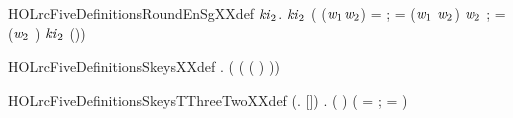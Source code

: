 \begin{SaveVerbatim}{HOLrcFiveDefinitionsRoundEnSgXXdef}
\HOLTokenTurnstile{} \HOLSymConst{\HOLTokenForall{}}  \ensuremath{\HOLBoundVar{ki}\sb{\mathrm{2}}}.
        \ensuremath{\HOLBoundVar{ki}\sb{\mathrm{2}}} \HOLSymConst{=}
     (
        (\ensuremath{\HOLBoundVar{w}\sb{\mathrm{1}}}\HOLSymConst{,}\ensuremath{\HOLBoundVar{w}\sb{\mathrm{2}}}) = ;
         = (\ensuremath{\HOLBoundVar{w}\sb{\mathrm{1}}} \HOLSymConst{\HOLTokenEor{}} \ensuremath{\HOLBoundVar{w}\sb{\mathrm{2}}}) \HOLSymConst{\HOLTokenRol{}}  \ensuremath{\HOLBoundVar{w}\sb{\mathrm{2}}} \HOLSymConst{\ensuremath{+}} ;
         = (\ensuremath{\HOLBoundVar{w}\sb{\mathrm{2}}} \HOLSymConst{\HOLTokenEor{}} ) \HOLSymConst{\HOLTokenRol{}}   \HOLSymConst{\ensuremath{+}} \ensuremath{\HOLBoundVar{ki}\sb{\mathrm{2}}}
        (\HOLSymConst{,}))
\end{SaveVerbatim}
\newcommand{\HOLrcFiveDefinitionsRoundEnSgXXdef}{\UseVerbatim{HOLrcFiveDefinitionsRoundEnSgXXdef}}
\begin{SaveVerbatim}{HOLrcFiveDefinitionsSkeysXXdef}
\HOLTokenTurnstile{} \HOLSymConst{\HOLTokenForall{}}.   \HOLSymConst{=}  (  ( \HOLSymConst{\HOLTokenProd{}} ( \HOLSymConst{\ensuremath{+}} ) \HOLSymConst{\ensuremath{-}} ))
\end{SaveVerbatim}
\newcommand{\HOLrcFiveDefinitionsSkeysXXdef}{\UseVerbatim{HOLrcFiveDefinitionsSkeysXXdef}}
\begin{SaveVerbatim}{HOLrcFiveDefinitionsSkeysTThreeTwoXXdef}
\HOLTokenTurnstile{} (\HOLSymConst{\HOLTokenForall{}}.    \HOLSymConst{=} []) \HOLSymConst{\HOLTokenConj{}}
   \HOLSymConst{\HOLTokenForall{}} .
       ( ) \HOLSymConst{=}
     (  =   ;  =     \HOLSymConst{\ensuremath{+}} \HOLSymConst{::})
\end{SaveVerbatim}
